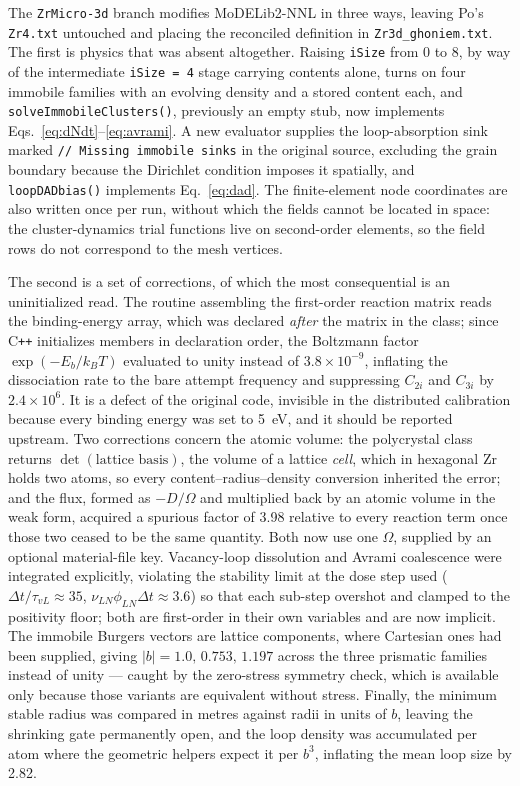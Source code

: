 \documentclass{article}
\newcommand{\ZrM}{\texttt{ZrMicro-3d}}
\newcommand{\MoD}{\textsf{MoDELib2-NNL}}
\begin{document}
The {\ZrM} branch modifies {\MoD} in three ways, leaving Po's \texttt{Zr4.txt}
untouched and placing the reconciled definition in \texttt{Zr3d\_ghoniem.txt}. The
first is physics that was absent altogether. Raising \texttt{iSize} from $0$ to
$8$, by way of the intermediate \texttt{iSize = 4} stage carrying contents alone,
turns on four immobile families with an evolving density and a stored content each,
and \texttt{solveImmobileClusters()}, previously an empty stub, now implements
Eqs.~\eqref{eq:dNdt}--\eqref{eq:avrami}. A new evaluator supplies the
loop-absorption sink marked \texttt{// Missing immobile sinks} in the original
source, excluding the grain boundary because the Dirichlet condition imposes it
spatially, and \texttt{loopDADbias()} implements Eq.~\eqref{eq:dad}. The
finite-element node coordinates are also written once per run, without which the
fields cannot be located in space: the cluster-dynamics trial functions live on
second-order elements, so the field rows do not correspond to the mesh vertices.

The second is a set of corrections, of which the most consequential is an
uninitialized read. The routine assembling the first-order reaction matrix reads
the binding-energy array, which was declared \emph{after} the matrix in the class;
since C\texttt{++} initializes members in declaration order, the Boltzmann factor
$\exp(-E_b/k_BT)$ evaluated to unity instead of $3.8\times10^{-9}$, inflating the
dissociation rate to the bare attempt frequency and suppressing $C_{2i}$ and
$C_{3i}$ by $2.4\times10^{6}$. It is a defect of the original code, invisible in
the distributed calibration because every binding energy was set to 5~eV, and it
should be reported upstream. Two corrections concern the atomic volume: the
polycrystal class returns $\det(\text{lattice basis})$, the volume of a lattice
\emph{cell}, which in hexagonal Zr holds two atoms, so every
content--radius--density conversion inherited the error; and the flux, formed as
$-D/\Omega$ and multiplied back by an atomic volume in the weak form, acquired a
spurious factor of 3.98 relative to every reaction term once those two ceased to be
the same quantity. Both now use one $\Omega$, supplied by an optional
material-file key. Vacancy-loop dissolution and Avrami coalescence were integrated
explicitly, violating the stability limit at the dose step used
($\Delta t/\tau_{vL}\approx35$, $\nu_{LN}\phi_{LN}\Delta t\approx3.6$) so that each
sub-step overshot and clamped to the positivity floor; both are first-order in
their own variables and are now implicit. The immobile Burgers vectors are lattice
components, where Cartesian ones had been supplied, giving
$|b|=1.0,\,0.753,\,1.197$ across the three prismatic families instead of unity ---
caught by the zero-stress symmetry check, which is available only because those
variants are equivalent without stress. Finally, the minimum stable radius was
compared in metres against radii in units of $b$, leaving the shrinking gate
permanently open, and the loop density was accumulated per atom where the geometric
helpers expect it per $b^3$, inflating the mean loop size by 2.82.
\end{document}
